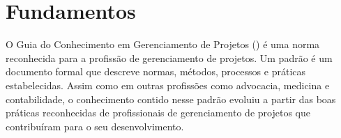 
\chapter{Fundamentos}

O Guia do Conhecimento em Gerenciamento de Projetos (\bok) é uma norma reconhecida para a profissão de gerenciamento de projetos. Um padrão é um documento formal que descreve normas, métodos, processos e práticas estabelecidas. Assim como em outras profissões como advocacia, medicina e contabilidade, o conhecimento contido nesse padrão evoluiu a partir das boas práticas reconhecidas de profissionais de gerenciamento de projetos que contribuíram para o seu desenvolvimento.